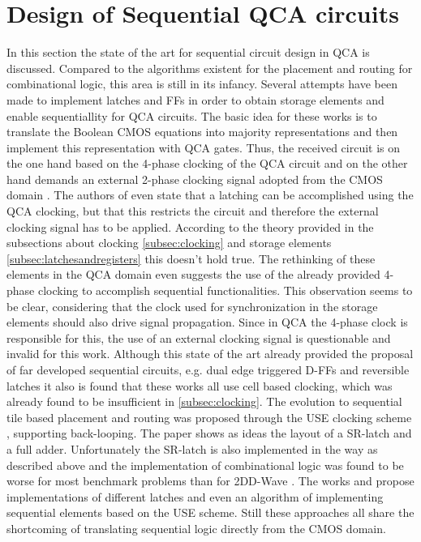 \section{Design of Sequential QCA circuits}
In this section the state of the art for sequential circuit design in QCA is discussed. Compared to the algorithms existent for the placement and routing for combinational logic, this area is still in its infancy. Several attempts \cite{sequential_cell_one, sequential_cell_two, dual_edge_triggered_FF_cell, sequential_reversible_cell} have been made to implement latches and FFs in order to obtain storage elements and enable sequentiallity for QCA circuits. The basic idea for these works is to translate the Boolean CMOS equations into majority representations and then implement this representation with QCA gates. Thus, the received circuit is on the one hand based on the 4-phase clocking of the QCA circuit and on the other hand demands an external 2-phase clocking signal adopted from the CMOS domain \cite{sequential_cell_one}. The authors of \cite{sequential_cell_two} even state that a latching can be accomplished using the QCA clocking, but that this restricts the circuit and therefore the external clocking signal has to be applied. According to the theory provided in the subsections about clocking \ref{subsec:clocking} and storage elements \ref{subsec:latchesandregisters} this doesn't hold true. The rethinking of these elements in the QCA domain even suggests the use of the already provided 4-phase clocking to accomplish sequential functionalities. This observation seems to be clear, considering that the clock used for synchronization in the storage elements should also drive signal propagation. Since in QCA the 4-phase clock is responsible for this, the use of an external clocking signal is questionable and invalid for this work. Although this state of the art already provided the proposal of far developed sequential circuits, e.g. dual edge triggered D-FFs \cite{dual_edge_triggered_FF_cell} and reversible latches \cite{sequential_reversible_cell} it also is found that these works all use cell based clocking, which was already found to be insufficient in \ref{subsec:clocking}. The evolution to sequential tile based placement and routing was proposed through the USE clocking scheme \cite{USE}, supporting back-looping. The paper shows as ideas the layout of a SR-latch and a full adder. Unfortunately the SR-latch is also implemented in the way as described above and the implementation of combinational logic was found to be worse for most benchmark problems than for 2DD-Wave \cite{Walter}. The works \cite{sequential_reversible_tile} and \cite{sequential_tile_CMOS_alg} propose implementations of different latches and even an algorithm of implementing sequential elements based on the USE scheme. Still these approaches all share the shortcoming of translating sequential logic directly from the CMOS domain.\\
